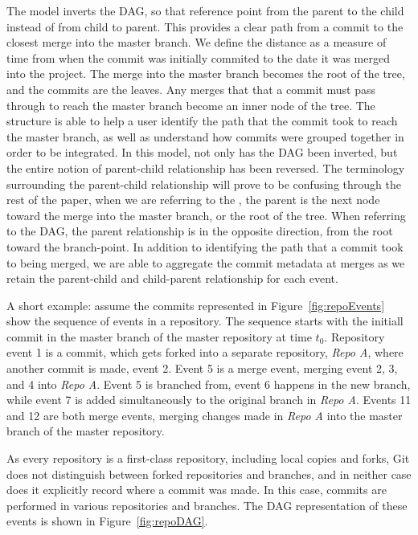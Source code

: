 The \mt model inverts the DAG, so that reference point from the parent
to the child instead of from child to parent. This provides a clear path
from a commit to the closest merge into the master branch. We define the
distance as a measure of time from when the commit was initially
commited to the date it was merged into the project. The merge into the
master branch becomes the root of the tree, and the commits are the
leaves. Any merges that that a commit must pass through to reach the
master branch become an inner node of the tree. The structure is able to
help a user identify the path that the commit took to reach the master
branch, as well as understand how commits were grouped together in order
to be integrated. In this model, not only has the DAG been inverted, but
the entire notion of parent-child relationship has been reversed. The
terminology surrounding the parent-child relationship will prove to be
confusing through the rest of the paper, when we are referring to the
\mt, the parent is the next node toward the merge into the master
branch, or the root of the tree. When referring to the DAG, the parent
relationship is in the opposite direction, from the root toward the
branch-point. In addition to identifying the path that a commit took to
being merged, we are able to aggregate the commit metadata at merges as
we retain the parent-child and child-parent relationship for each event.

A short example: assume the commits represented in
Figure~\ref{fig:repoEvents} show the sequence of events in a repository.
The sequence starts with the initiall commit in the master branch of the
master repository at time $t_0$. Repository event 1 is a commit, which
gets forked into a separate repository, \textit{Repo A}, where another
commit is made, event 2. Event 5 is a merge event, merging event 2, 3,
and 4 into \textit{Repo A}. Event 5 is branched from, event 6 happens in
the new branch, while event 7 is added simultaneously to the original
branch in \textit{Repo A}. Events 11 and 12 are both merge events,
merging changes made in \textit{Repo A} into the master branch of the
master repository.

As every repository is a first-class repository, including local copies
and forks, Git does not distinguish between forked repositories and
branches, and in neither case does it explicitly record where a commit
was made. In this case, commits are performed in various repositories
and branches. The DAG representation of these events is shown in
Figure~\ref{fig:repoDAG}.

